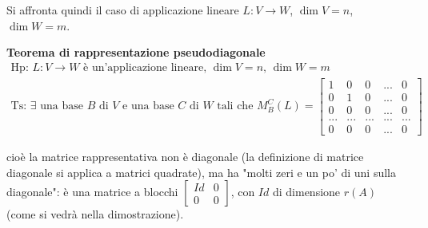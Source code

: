 \documentclass{article}
\begin{document}
Si affronta quindi il caso di applicazione lineare $L:V\rightarrow W$, $\dim
V=n$, $\dim W=m$.

\textbf{Teorema di rappresentazione pseudodiagonale}%
\begin{gather*}
\text{Hp}\text{: }L:V\rightarrow W\text{ \`{e} un'applicazione lineare, }%
\dim V=n\text{, }\dim W=m \\
\text{Ts}\text{: }\exists \text{ una base }B\text{ di }V\text{ e una base }C%
\text{ di }W\text{ tali che }M_{B}^{C}\left( L\right) =\left[ 
\begin{array}{ccccc}
1 & 0 & 0 & ... & 0 \\ 
0 & 1 & 0 & ... & 0 \\ 
0 & 0 & 0 & ... & 0 \\ 
... & ... & ... & ... & ... \\ 
0 & 0 & 0 & ... & 0%
\end{array}%
\right]
\end{gather*}

cio\`{e} la matrice rappresentativa non \`{e} diagonale (la definizione di
matrice diagonale si applica a matrici quadrate), ma ha "molti zeri e un po'
di uni sulla diagonale": \`{e} una matrice a blocchi $\left[ 
\begin{array}{cc}
Id & 0 \\ 
0 & 0%
\end{array}%
\right] $, con $Id$ di dimensione $r\left( A\right) $ (come si vedr\`{a}
nella dimostrazione).
\end{document}
